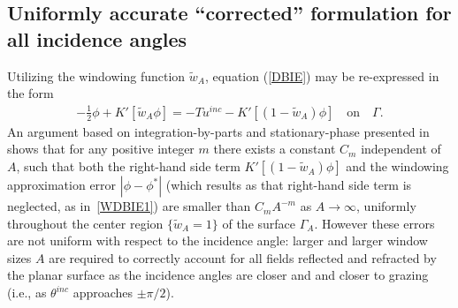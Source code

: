 \documentclass[10pt]{article}
\numberwithin{equation}{section}
\newcommand{\be}{\begin{eqnarray}}
\newcommand{\en}{\end{eqnarray}}
\begin{document}


\subsection{Uniformly accurate ``corrected'' formulation for all
  incidence angles}
\label{sec:3.2}

Utilizing the windowing function $\widetilde{w}_A$, equation
(\ref{DBIE}) may be re-expressed in the form \be
\label{ExactWDBIE1}
-\frac{1}{2}\phi+K'[\widetilde{w}_A\phi]=-Tu^{inc}-K'[(1-\widetilde{w}_A)\phi]
\quad\mbox{on}\quad\Gamma. \en An argument based on
integration-by-parts and stationary-phase presented in~\cite{BLPT16}
shows that for any positive integer $m$ there exists a constant $C_m$
independent of $A$, such that both the right-hand side term
$K'[(1-\widetilde{w}_A)\phi]$ and the windowing approximation error
$|\phi-\phi^*|$ (which results as that right-hand side term is
neglected, as in~\eqref{WDBIE1}) are smaller than $C_mA^{-m}$ as
$A\rightarrow\infty$, uniformly throughout the center region
$\{\widetilde{w}_A=1\}$ of the surface $\Gamma_A$.  However these
errors are not uniform with respect to the incidence angle: larger and
larger window sizes $A$ are required to correctly account for all
fields reflected and refracted by the planar surface as the incidence
angles are closer and and closer to grazing (i.e., as $\theta^{inc}$
approaches $\pm\pi/2$).
\end{document}
